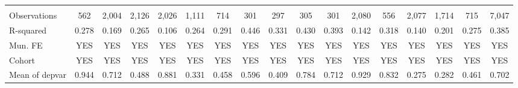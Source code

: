 \begin{tabular}{lcccccccccccccccc}
 &  &  &  &  &  &  &  &  &  &  &  &  &  &  &  &  \\
Observations & 562 & 2,004 & 2,126 & 2,026 & 1,111 & 714 & 301 & 297 & 305 & 301 & 2,080 & 556 & 2,077 & 1,714 & 715 & 7,047 \\
R-squared & 0.278 & 0.169 & 0.265 & 0.106 & 0.264 & 0.291 & 0.446 & 0.331 & 0.430 & 0.393 & 0.142 & 0.318 & 0.140 & 0.201 & 0.275 & 0.385 \\
Mun. FE & YES & YES & YES & YES & YES & YES & YES & YES & YES & YES & YES & YES & YES & YES & YES & YES \\
Cohort & YES & YES & YES & YES & YES & YES & YES & YES & YES & YES & YES & YES & YES & YES & YES & YES \\
 Mean of depvar & 0.944 & 0.712 & 0.488 & 0.881 & 0.331 & 0.458 & 0.596 & 0.409 & 0.784 & 0.712 & 0.929 & 0.832 & 0.275 & 0.282 & 0.461 & 0.702 \\ \hline
\end{tabular}
